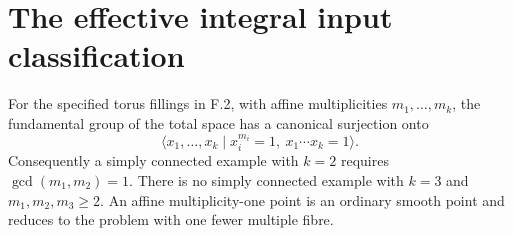 \section{The effective integral input classification}



\begin{theorem}\label{maps:src:F.2.7}


For the specified torus fillings in F.2, with affine
multiplicities $m_1,\ldots,m_k$, the fundamental group of the
total space has a canonical surjection onto
\[
 \langle x_1,\ldots,x_k\mid
       x_i^{m_i}=1,\ x_1\cdots x_k=1\rangle.
 \tag{F.27}\label{maps:eq:F.27}
\]
Consequently a simply connected example with $k=2$ requires
$\gcd(m_1,m_2)=1$.  There is no simply connected example with
$k=3$ and $m_1,m_2,m_3\geq2$.  An affine multiplicity-one
point is an ordinary smooth point and reduces to the problem
with one fewer multiple fibre.

\end{theorem}


